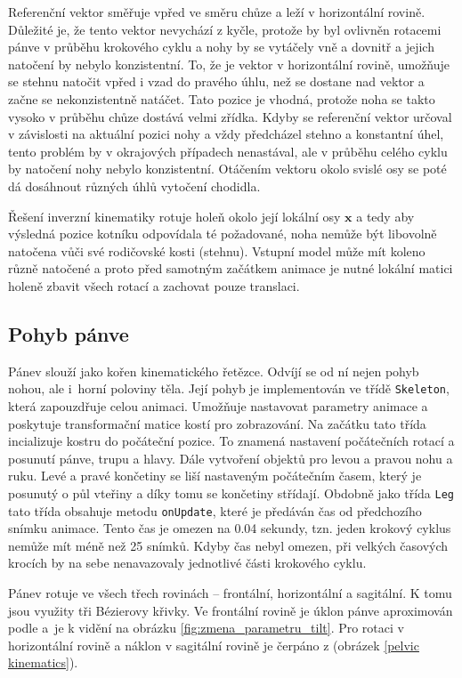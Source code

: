 Referenční vektor směřuje vpřed ve směru chůze a leží v horizontální rovině. Důležité je, že tento vektor nevychází z kyčle, protože by byl ovlivněn rotacemi pánve v průběhu krokového cyklu a nohy by se vytáčely vně a dovnitř a jejich natočení by nebylo konzistentní. To, že je vektor v horizontální rovině, umožňuje se stehnu natočit vpřed i vzad do pravého úhlu, než se dostane nad vektor a začne se nekonzistentně natáčet. Tato pozice je vhodná, protože noha se takto vysoko v průběhu chůze dostává velmi zřídka. Kdyby se referenční vektor určoval v závislosti na aktuální pozici nohy a vždy předcházel stehno a konstantní úhel, tento problém by v okrajových případech nenastával, ale v průběhu celého cyklu by natočení nohy nebylo konzistentní. Otáčením vektoru okolo svislé osy se poté dá dosáhnout různých úhlů vytočení chodidla.

Řešení inverzní kinematiky rotuje holeň okolo její lokální osy $\mathbf{x}$ a tedy aby  výsledná pozice kotníku odpovídala té požadované, noha nemůže být libovolně natočena vůči své rodičovské kosti (stehnu). Vstupní model může mít koleno různě natočené a proto před samotným začátkem animace je nutné lokální matici holeně zbavit všech rotací a zachovat pouze translaci.

\subsection{Pohyb pánve}
Pánev slouží jako kořen kinematického řetězce. Odvíjí se od ní nejen pohyb nohou, ale i~horní poloviny těla. Její pohyb je implementován ve třídě \texttt{Skeleton}, která zapouzdřuje celou animaci. Umožňuje nastavovat parametry animace a poskytuje transformační matice kostí pro zobrazování.  Na začátku tato třída incializuje kostru do počáteční pozice. To znamená nastavení počátečních rotací a posunutí pánve, trupu a hlavy. Dále vytvoření objektů pro levou a pravou nohu a ruku. Levé a pravé končetiny se liší nastaveným počátečním časem, který je posunutý o půl vteřiny a díky tomu se končetiny střídají. Obdobně jako třída \texttt{Leg} tato třída obsahuje metodu \texttt{onUpdate}, které je předáván čas od předchozího snímku animace. Tento čas je omezen na 0.04 sekundy, tzn. jeden krokový cyklus nemůže mít méně než 25 snímků. Kdyby čas nebyl omezen, při velkých časových krocích by na sebe nenavazovaly jednotlivé části krokového cyklu.

Pánev rotuje ve všech třech rovinách -- frontální, ho\-ri\-zontální a sagitální. K tomu jsou využity tři Bézierovy křivky. Ve frontální rovině je úklon pánve aproximován podle \cite{lin2014quantitative} a~je k vidění na obrázku \ref{fig:zmena_parametru_tilt}. Pro rotaci v horizontální rovině a náklon v sagitální rovině je čerpáno z \cite{biomechanika_chuze} (obrázek \ref{pelvic kinematics}).

